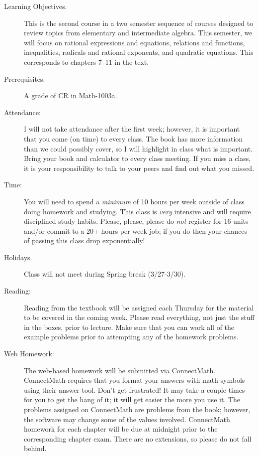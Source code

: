 \documentclass[letterpaper,12pt,fleqn]{article}
\begin{document}
\begin{description}
\item[Learning Objectives.] This is the second course in a two semester sequence
  of courses designed to review topics from elementary and intermediate algebra.
  This semester, we will focus on rational expressions and equations, relations
  and functions, inequalities, radicals and rational exponents, and quadratic
  equations. This corresponds to chapters 7--11 in the text.

\item[Prerequisites.] A grade of CR in Math-1003a.
\newpage
\item[Attendance:] I will not take attendance after the first week; however, it
  is important that you come (on time) to every class. The book has more
  information than we could possibly cover, so I will highlight in class
  what is important. Bring your book and calculator to every class meeting. If
  you miss a class, it is your responsibility to talk to your peers and find out
  what you missed.

\item[Time:] You will need to spend a \emph{minimum} of 10 hours per week outside
  of class doing homework and studying. This class is \emph{very} intensive and
  will require disciplined study habits. Please, please, please do \emph{not}
  register for 16 units and/or commit to a 20+ hours per week job; if you do then
  your chances of passing this class drop exponentially!

\item[Holidays.] Class will not meet during Spring break (3/27-3/30).

\item[Reading:] Reading from the textbook will be assigned each Thursday for the
  material to be covered in the coming week. Please read everything, not
  just the stuff in the boxes, prior to lecture. Make sure that you can work
  all of the example problems prior to attempting any of the homework problems.

\item[Web Homework:] The web-based homework will be submitted via ConnectMath.
  ConnectMath requires that you format your answers with math symbols
  using their answer tool. Don't get frustrated! It may take a couple times for
  you to get the hang of it; it will get easier the more you use it. The
  problems assigned on ConnectMath are problems from the book; however, the
  software may change some of the values involved. ConnectMath homework for each
  chapter will be due at midnight prior to the corresponding chapter exam.
  There are no extensions, so please do not fall behind.


\end{description}
\end{document}
